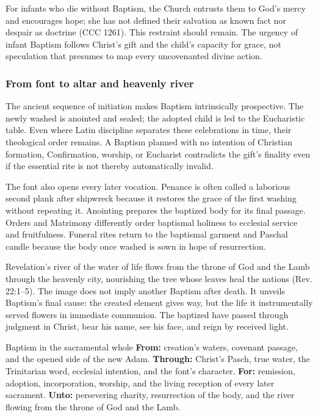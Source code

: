 For infants who die without Baptism, the Church entrusts them to God's mercy and encourages hope; she has not defined their salvation as known fact nor despair as doctrine (CCC 1261). This restraint should remain. The urgency of infant Baptism follows Christ's gift and the child's capacity for grace, not speculation that presumes to map every uncovenanted divine action.

\subsubsection{From font to altar and heavenly river}

The ancient sequence of initiation makes Baptism intrinsically prospective. The newly washed is anointed and sealed; the adopted child is led to the Eucharistic table. Even where Latin discipline separates these celebrations in time, their theological order remains. A Baptism planned with no intention of Christian formation, Confirmation, worship, or Eucharist contradicts the gift's finality even if the essential rite is not thereby automatically invalid.

The font also opens every later vocation. Penance is often called a laborious second plank after shipwreck because it restores the grace of the first washing without repeating it. Anointing prepares the baptized body for its final passage. Orders and Matrimony differently order baptismal holiness to ecclesial service and fruitfulness. Funeral rites return to the baptismal garment and Paschal candle because the body once washed is sown in hope of resurrection.

Revelation's river of the water of life flows from the throne of God and the Lamb through the heavenly city, nourishing the tree whose leaves heal the nations (Rev. 22:1--5). The image does not imply another Baptism after death. It unveils Baptism's final cause: the created element gives way, but the life it instrumentally served flowers in immediate communion. The baptized have passed through judgment in Christ, bear his name, see his face, and reign by received light.

\begin{massbox}{Baptism in the sacramental whole}
\textbf{From:} creation's waters, covenant passage, and the opened side of the new Adam. \textbf{Through:} Christ's Pasch, true water, the Trinitarian word, ecclesial intention, and the font's character. \textbf{For:} remission, adoption, incorporation, worship, and the living reception of every later sacrament. \textbf{Unto:} persevering charity, resurrection of the body, and the river flowing from the throne of God and the Lamb.
\end{massbox}
